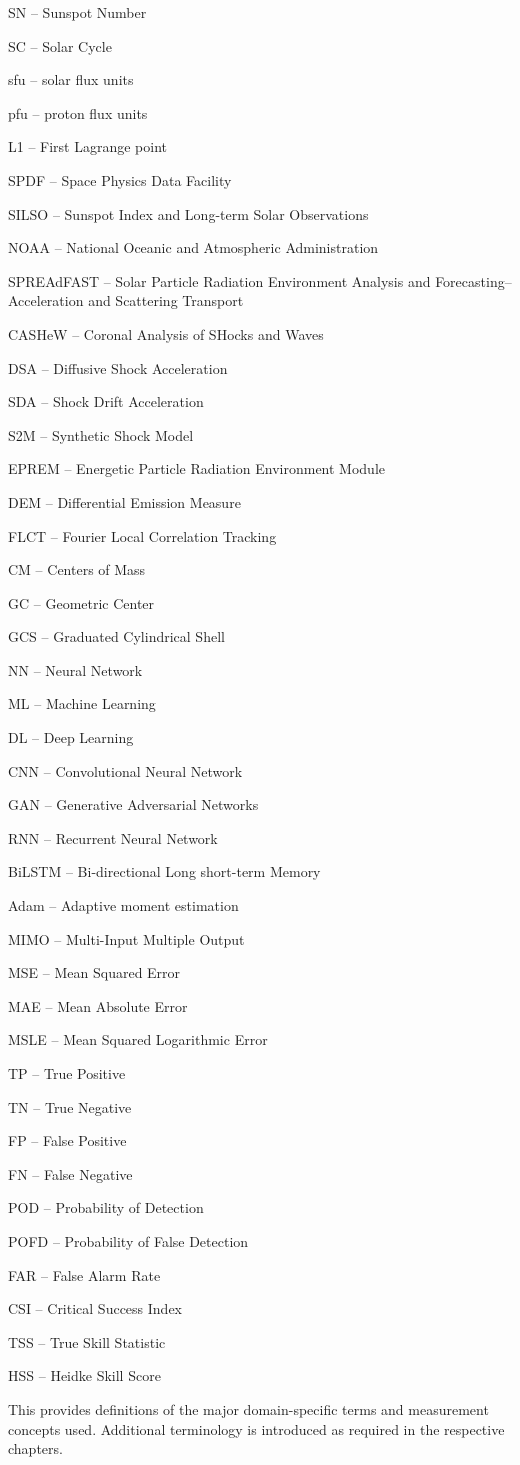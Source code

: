 SN -- Sunspot Number

SC -- Solar Cycle

sfu -- solar flux units

pfu -- proton flux units

L1 -- First Lagrange point

SPDF -- Space Physics Data Facility

SILSO -- Sunspot Index and Long-term Solar Observations

NOAA -- National Oceanic and Atmospheric Administration

SPREAdFAST -- Solar Particle Radiation Environment Analysis and Forecasting–Acceleration and Scattering Transport

CASHeW -- Coronal Analysis of SHocks and Waves

DSA -- Diffusive Shock Acceleration

SDA -- Shock Drift Acceleration

S2M -- Synthetic Shock Model

EPREM -- Energetic Particle Radiation Environment Module

DEM -- Differential Emission Measure

FLCT -- Fourier Local Correlation Tracking

CM -- Centers of Mass

GC -- Geometric Center

GCS -- Graduated Cylindrical Shell

NN -- Neural Network

ML -- Machine Learning

DL -- Deep Learning

CNN -- Convolutional Neural Network

GAN -- Generative Adversarial Networks

RNN -- Recurrent Neural Network

BiLSTM -- Bi-directional Long short-term Memory

Adam -- Adaptive moment estimation

MIMO -- Multi-Input Multiple Output

MSE -- Mean Squared Error

MAE -- Mean Absolute Error

MSLE -- Mean Squared Logarithmic Error

TP -- True Positive

TN -- True Negative

FP -- False Positive

FN -- False Negative

POD -- Probability of Detection

POFD -- Probability of False Detection

FAR -- False Alarm Rate

CSI -- Critical Success Index

TSS -- True Skill Statistic

HSS -- Heidke Skill Score

This provides definitions of the major domain-specific terms and measurement concepts used. Additional terminology is introduced as required in the respective chapters.

